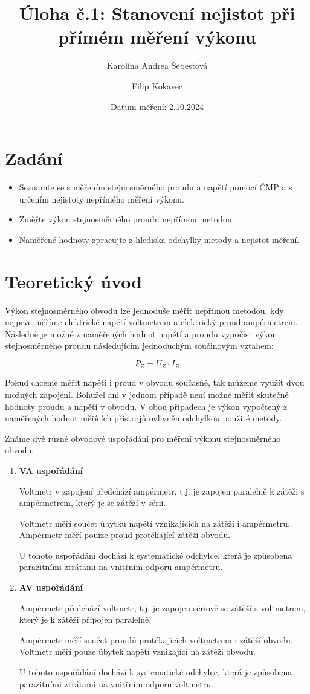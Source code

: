 \documentclass[a4paper, czech]{article}
\title{Úloha č.1: Stanovení nejistot při přímém měření výkonu}
\author{Karolína Andrea Šebestová \and Filip Kokavec}
\date{Datum měření: 2.10.2024}
\begin{document}
\maketitle

\section{Zadání}

\begin{itemize}
    \item Seznamte se s měřením stejnosměrného proudu a napětí pomocí ČMP a s určením nejistoty nepřímého měření výkonu.
    \item Změřte výkon stejnosměrného proudu nepřímou metodou.
    \item Naměřené hodnoty zpracujte z hlediska odchylky metody a nejistot měření.
\end{itemize}

\section{Teoretický úvod}

Výkon stejnosměrného obvodu lze jednoduše měřit nepřímou metodou, kdy nejprve měříme elektrické napětí voltmetrem a elektrický proud ampérmetrem.
Následně je možné z naměřených hodnot napětí a proudu vypočíst výkon stejnosměrného proudu následujícím jednoduchým součinovým vztahem:

$$P_Z = U_Z \cdot I_Z$$

Pokud chceme měřit napětí i proud v obvodu současně, tak můžeme využít dvou možných zapojení.
Bohužel ani v jednom případě není možné měřit skutečné hodnoty proudu a napětí v obvodu.
V obou případech je výkon vypočtený z naměřených hodnot měřících přístrojů ovlivněn odchylkou použité metody.

Známe dvě různé obvodové uspořádání pro měření výkonu stejnosměrného obvodu:

\begin{enumerate}
    \item \textbf{VA uspořádání}

    Voltmetr v zapojení předchází ampérmetr, t.j. je zapojen paralelně k zátěži s ampérmetrem, který je se zátěží v sérii.

    Voltmetr měří součet úbytků napětí vznikajících na zátěži i ampérmetru.
    Ampérmetr měří pouize proud protékající zátěží obvodu.

    U tohoto uspořádání dochází k systematické odchylce, která je způsobena parazitními ztrátami na vnitřním odporu ampérmetru.

    \item \textbf{AV uspořádání}

    Ampérmetr předchází voltmetr, t.j. je zapojen sériově se zátěží s voltmetrem, který je k zátěži připojen paralelně.

    Ampérmetr měří součet proudů protékajících voltmetrem i zátěží obvodu.
    Voltmetr měří pouze úbytek napětí vznikající na zátěži obvodu.

    U tohoto uspořádání dochází k systematické odchylce, která je způsobena parazitními ztrátami na vnitřním odporu voltmetru.
\end{enumerate}
\end{document}
